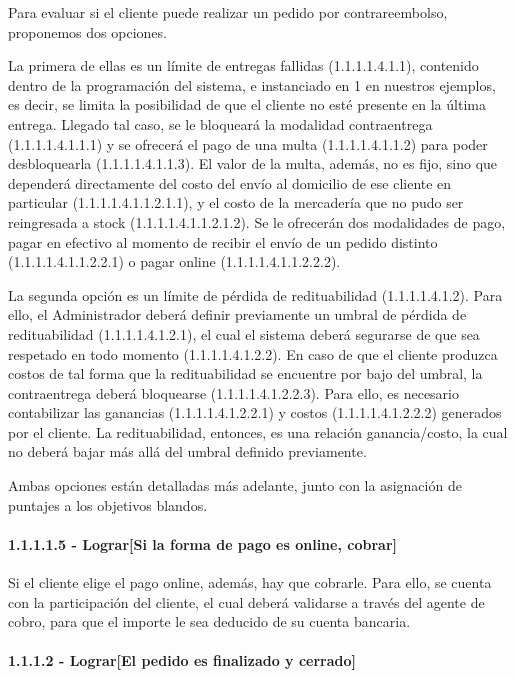 Para evaluar si el cliente puede realizar un pedido por contrareembolso,
proponemos dos opciones. 

La primera de ellas es un límite de entregas fallidas (1.1.1.1.4.1.1), contenido
dentro de la programación del sistema, e instanciado en 1 en nuestros ejemplos,
es decir, se limita la posibilidad de que el cliente no esté presente en la
última entrega. Llegado tal caso, se le bloqueará la modalidad contraentrega
(1.1.1.1.4.1.1.1) y se ofrecerá el pago de una multa (1.1.1.1.4.1.1.2) para
poder desbloquearla (1.1.1.1.4.1.1.3). El valor de la multa, además, no es fijo,
sino que dependerá directamente del costo del envío al domicilio de ese cliente
en particular (1.1.1.1.4.1.1.2.1.1), y el costo de la mercadería que no pudo ser
reingresada a stock (1.1.1.1.4.1.1.2.1.2). Se le ofrecerán dos modalidades de
pago, pagar en efectivo al momento de recibir el envío de un pedido distinto
(1.1.1.1.4.1.1.2.2.1) o pagar online (1.1.1.1.4.1.1.2.2.2).

La segunda opción es un límite de pérdida de redituabilidad (1.1.1.1.4.1.2).
Para ello, el Administrador deberá definir previamente un umbral de pérdida de
redituabilidad (1.1.1.1.4.1.2.1), el cual el sistema deberá segurarse de que sea
respetado en todo momento (1.1.1.1.4.1.2.2). En caso de que el cliente produzca
costos de tal forma que la redituabilidad se encuentre por bajo del umbral, la
contraentrega deberá bloquearse (1.1.1.1.4.1.2.2.3). Para ello, es necesario
contabilizar las ganancias (1.1.1.1.4.1.2.2.1) y costos (1.1.1.1.4.1.2.2.2)
generados por el cliente. La redituabilidad, entonces, es una relación
ganancia/costo, la cual no deberá bajar más allá del umbral definido
previamente.

Ambas opciones están detalladas más adelante, junto con la asignación de
puntajes a los objetivos blandos.

\paragraph{1.1.1.1.5 - Lograr[Si la forma de pago es online, cobrar]}

Si el cliente elige el pago online, además, hay que cobrarle. Para ello, se
cuenta con la participación del cliente, el cual deberá validarse a través del
agente de cobro, para que el importe le sea deducido de su cuenta bancaria.

\paragraph{1.1.1.2 - Lograr[El pedido es finalizado y cerrado]}

